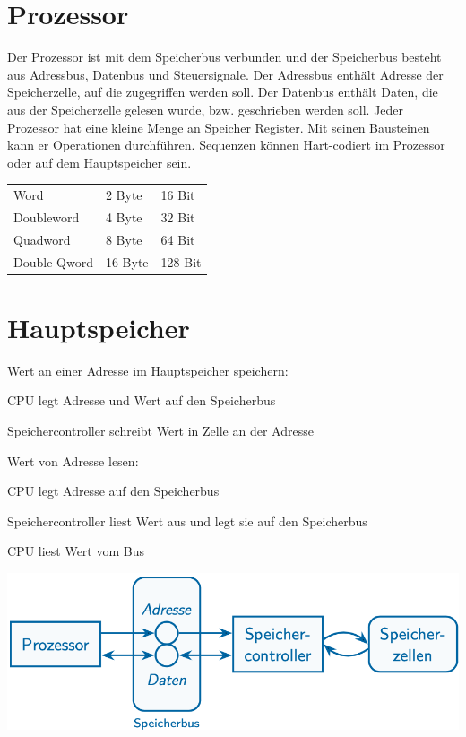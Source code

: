\documentclass[8pt,landscape,a4paper]{scrartcl}
\begin{document}
\begin{multicols*}{5}
\section{Prozessor}
Der Prozessor ist mit dem \textcolor{b}{Speicherbus} verbunden und der Speicherbus besteht aus Adressbus, Datenbus und Steuersignale. Der \textcolor{b}{Adressbus} enthält Adresse der Speicherzelle, auf die zugegriffen werden soll. Der \textcolor{b}{Datenbus} enthält Daten, die aus der Speicherzelle gelesen wurde, bzw. geschrieben werden soll. Jeder Prozessor hat eine kleine Menge an Speicher \textcolor{b}{Register}. Mit seinen Bausteinen kann er \textcolor{b}{Operationen} durchführen. \textcolor{b}{Sequenzen} können Hart-codiert im Prozessor oder auf dem Hauptspeicher sein.
\begin{center}
\begin{tabular}{l l l }
	\hline
	Word & 2 Byte & 16 Bit\\
	Doubleword & 4 Byte & 32 Bit\\
	Quadword & 8 Byte & 64 Bit\\
	Double Qword & 16 Byte & 128 Bit \\
	\hline
\end{tabular}	
\end{center}

\section{Hauptspeicher}
\vspace{-6pt}
\begin{multicols}{2}
	Wert an einer Adresse im Hauptspeicher \textcolor{b}{speichern}:
	\begin{compactenum} []
		\item CPU legt Adresse und Wert auf den Speicherbus
		\item Speichercontroller schreibt Wert in Zelle an der Adresse
	\end{compactenum}
	\columnbreak
	Wert von Adresse \textcolor{b}{lesen}:
	\begin{compactenum}[]
		\item CPU legt Adresse auf den Speicherbus
		\item Speichercontroller liest Wert aus und legt sie auf den Speicherbus
		\item CPU liest Wert vom Bus
	\end{compactenum}
\end{multicols}
\vspace{-10pt}
\begin{center}
	\includegraphics[scale=.3]{Graphic/Speicherbus}
\end{center}
\vspace{-10pt}

\end{multicols*}
\end{document}
